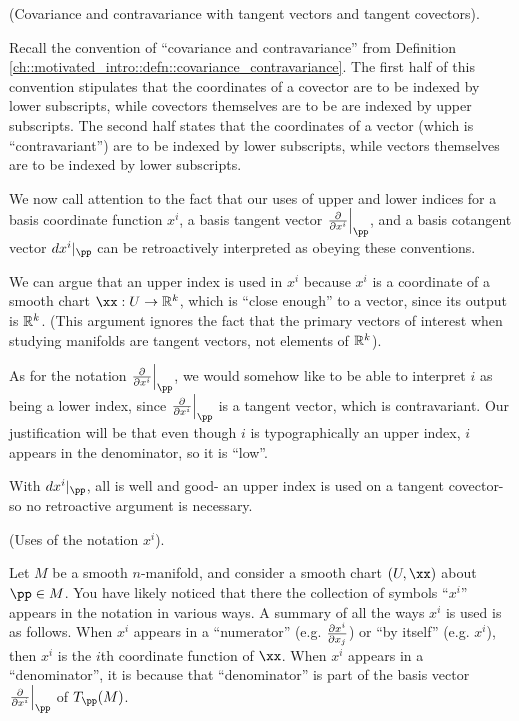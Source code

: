 \begin{remark}
    (Covariance and contravariance with tangent vectors and tangent covectors).
    
    Recall the convention of ``covariance and contravariance'' from Definition \ref{ch::motivated_intro::defn::covariance_contravariance}. The first half of this convention stipulates that the coordinates of a covector are to be indexed by lower subscripts, while covectors themselves are to be are indexed by upper subscripts. The second half states that the coordinates of a vector (which is ``contravariant'') are to be indexed by lower subscripts, while vectors themselves are to be indexed by lower subscripts.
    
    We now call attention to the fact that our uses of upper and lower indices for a basis coordinate function $x^i$, a basis tangent vector $\frac{\pd}{\pd x^i}\Big|_\pp$, and a basis cotangent vector $dx^i|_\pp$ can be retroactively interpreted as obeying these conventions. 
    
    We can argue that an upper index is used in $x^i$ because $x^i$ is a coordinate of a smooth chart $\xx:U \rightarrow \R^k$, which is ``close enough'' to a vector, since its output is $\mathbb{R}^k$. (This argument ignores the fact that the primary vectors of interest when studying manifolds are tangent vectors, not elements of $\mathbb{R}^k$).
    
    As for the notation $\frac{\pd}{\pd x^i}\Big|_\pp$, we would somehow like to be able to interpret $i$ as being a lower index, since $\frac{\pd}{\pd x^i}\Big|_\pp$ is a tangent vector, which is contravariant. Our justification will be that even though $i$ is typographically an upper index, $i$ appears in the denominator, so it is ``low''.
    
    With $dx^i|_\pp$, all is well and good- an upper index is used on a tangent covector- so no retroactive argument is necessary. 
\end{remark}

\begin{remark}
    (Uses of the notation $x^i$).
    
    Let $M$ be a smooth $n$-manifold, and consider a smooth chart $(U, \xx)$ about $\pp \in M$. You have likely noticed that there the collection of symbols ``$x^i$'' appears in the notation in various ways. A summary of all the ways $x^i$ is used is as follows. When $x^i$ appears in a ``numerator'' (e.g. $\frac{\partial x^i}{\partial x_j}$) or ``by itself'' (e.g. $x^i$), then $x^i$ is the $i$th coordinate function of $\xx$. When $x^i$ appears in a ``denominator'', it is because that ``denominator'' is part of the basis vector $\frac{\pd}{\pd x^i}\Big|_\pp$ of $T_\pp(M)$.
\end{remark}

